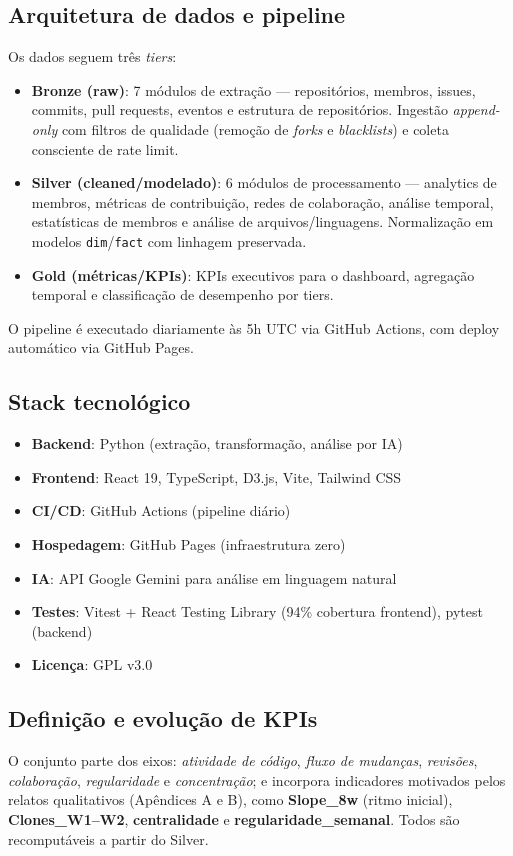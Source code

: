 \documentclass[
	12pt,
	openright,
	oneside,
	a4paper,
	brazil
]{abntex2}
\begin{document}
\subsection{Arquitetura de dados e pipeline}
Os dados seguem três \textit{tiers}:
\begin{itemize}
    \item \textbf{Bronze (raw)}: 7 módulos de extração --- repositórios, membros, issues, commits, pull requests, eventos e estrutura de repositórios. Ingestão \emph{append-only} com filtros de qualidade (remoção de \emph{forks} e \emph{blacklists}) e coleta consciente de rate limit.
    \item \textbf{Silver (cleaned/modelado)}: 6 módulos de processamento --- analytics de membros, métricas de contribuição, redes de colaboração, análise temporal, estatísticas de membros e análise de arquivos/linguagens. Normalização em modelos \texttt{dim}/\texttt{fact} com linhagem preservada.
    \item \textbf{Gold (métricas/KPIs)}: KPIs executivos para o dashboard, agregação temporal e classificação de desempenho por tiers.
\end{itemize}

O pipeline é executado diariamente às 5h UTC via GitHub Actions, com deploy automático via GitHub Pages.

\subsection{Stack tecnológico}
\begin{itemize}
    \item \textbf{Backend}: Python (extração, transformação, análise por IA)
    \item \textbf{Frontend}: React 19, TypeScript, D3.js, Vite, Tailwind CSS
    \item \textbf{CI/CD}: GitHub Actions (pipeline diário)
    \item \textbf{Hospedagem}: GitHub Pages (infraestrutura zero)
    \item \textbf{IA}: API Google Gemini para análise em linguagem natural
    \item \textbf{Testes}: Vitest + React Testing Library (94\% cobertura frontend), pytest (backend)
    \item \textbf{Licença}: GPL v3.0
\end{itemize}

\subsection{Definição e evolução de KPIs}
O conjunto parte dos eixos: \emph{atividade de código}, \emph{fluxo de mudanças}, \emph{revisões}, \emph{colaboração}, \emph{regularidade} e \emph{concentração}; e incorpora indicadores motivados pelos relatos qualitativos (Apêndices A e B), como \textbf{Slope\_8w} (ritmo inicial), \textbf{Clones\_W1--W2}, \textbf{centralidade} e \textbf{regularidade\_semanal}. Todos são recomputáveis a partir do Silver.
\end{document}
